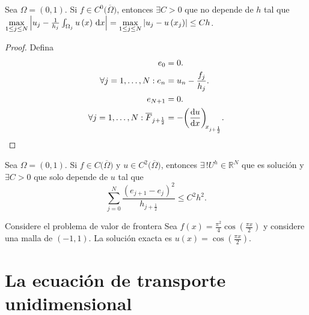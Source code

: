 \begin{theorem}
	Sea $\Omega=\left(0,1\right)$.
	Si $f\in C^{0}\big(\overline{\Omega}\big)$, entonces
	$\exists C>0$ que no depende de $h$ tal que
	\begin{math}
		\max\limits_{1\leq j\leq N}
		\left|
		u_{j}-
		\frac{1}{h_{j}}
		\int_{\Omega_{j}}
		u\left(x\right)\dl x
		\right|=
		\max\limits_{1\leq j\leq N}
		\left|
		u_{j}-
		u\left(x_{j}\right)
		\right|\leq
		Ch
	\end{math}.
\end{theorem}

\begin{proof}
	Defina
	\begin{align*}
		e_{0}                        & =0. \\
		\forall j=1,\dotsc,N:
		e_{n}                        & =
		u_{n}-\frac{f_{j}}{h_{j}}.         \\
		e_{N+1}                      & =0. \\
		\forall j=1,\dotsc,N:
		\overline{F}_{j+\frac{1}{2}} & =
		-\diff{u}{x}[x_{j+\frac{1}{2}}].
	\end{align*}
\end{proof}

\begin{theorem}
	Sea $\Omega=\left(0,1\right)$.
	Si $f\in C\big(\overline{\Omega}\big)$ y
	$u\in C^{2}\big(\overline{\Omega}\big)$, entonces
	$\exists\,!U^{h}\in\mathbb{R}^{N}$ que es solución
	y $\exists C>0$ que solo depende de $u$ tal que
	\begin{equation*}
		\sum_{j=0}^{N}
		\frac{\left(e_{j+1}-e_{j}\right)^{2}}{h_{j+\frac{1}{2}}}\leq
		C^{2}h^{2}.
	\end{equation*}
\end{theorem}

\begin{example}
	Considere el problema de valor de frontera Sea
	\begin{math}
		f\left(x\right)=
		\frac{\pi^{2}}{4}
		\cos\left(\frac{\pi x}{2}\right)
	\end{math}
	y considere una malla de $\left(-1,1\right)$.
	La solución exacta es
	\begin{math}
		u\left(x\right)=
		\cos\left(\frac{\pi x}{2}\right)
	\end{math}.
\end{example}

\section{La ecuación de transporte unidimensional}

